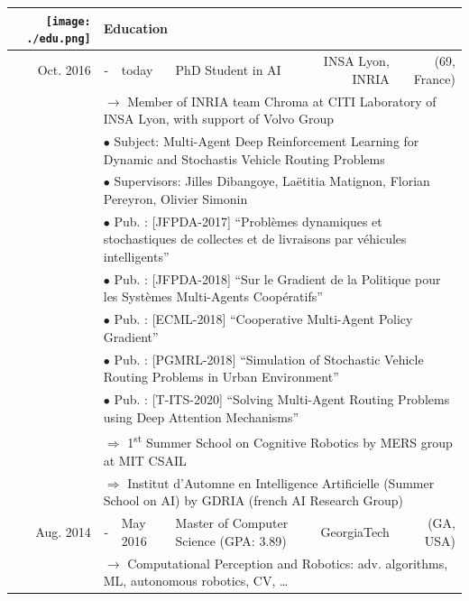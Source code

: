 \documentclass[a4paper]{article}
\begin{document}
\centering
\begin{tabular}{>{\small}r c >{\small}l l r r}
	\texttt{[image: ./edu.png]} &
		\multicolumn{5}{l}{Education} \\
	\hline
	Oct. 2016 &- &today      &PhD Student in AI                      &INSA Lyon, INRIA         &(69, France) \\
		&\multicolumn{5}{l}{$\rightarrow$ {\footnotesize Member of INRIA team Chroma at CITI Laboratory of INSA Lyon, with support of Volvo Group}} \\
		&\multicolumn{5}{l}{$\bullet$ {\footnotesize Subject: Multi-Agent Deep Reinforcement Learning for Dynamic and Stochastis Vehicle Routing Problems}} \\
		&\multicolumn{5}{l}{$\bullet$ {\footnotesize Supervisors: Jilles Dibangoye, La\"etitia Matignon, Florian Pereyron, Olivier Simonin}} \\
		&\multicolumn{5}{l}{$\bullet$ {\footnotesize Pub. : [JFPDA-2017]} {\scriptsize ``Problèmes dynamiques et stochastiques de collectes et de livraisons par véhicules intelligents''}} \\
		&\multicolumn{5}{l}{$\bullet$ {\footnotesize Pub. : [JFPDA-2018]} {\scriptsize ``Sur le Gradient de la Politique pour les Systèmes Multi-Agents Coopératifs''}} \\
		&\multicolumn{5}{l}{$\bullet$ {\footnotesize Pub. : [ECML-2018]} {\scriptsize ``Cooperative Multi-Agent Policy Gradient''}} \\
		&\multicolumn{5}{l}{$\bullet$ {\footnotesize Pub. : [PGMRL-2018]} {\scriptsize ``Simulation of Stochastic Vehicle Routing Problems in Urban Environment'' }} \\
		&\multicolumn{5}{l}{$\bullet$ {\footnotesize Pub. : [T-ITS-2020]} {\scriptsize ``Solving Multi-Agent Routing Problems using Deep Attention Mechanisms''}} \\
		&\multicolumn{5}{l}{$\Rightarrow$ {\footnotesize 1\textsuperscript{st} Summer School on Cognitive Robotics by MERS group at MIT CSAIL}} \\
		&\multicolumn{5}{l}{$\Rightarrow$ {\footnotesize Institut d'Automne en Intelligence Artificielle (Summer School on AI) by GDRIA (french AI Research Group)}} \\
	Aug. 2014 &- &May 2016   &Master of Computer Science (GPA: 3.89) &GeorgiaTech              &(GA, USA) \\
		&\multicolumn{5}{l}{$\rightarrow$ {\footnotesize Computational Perception and Robotics: adv. algorithms, ML, autonomous robotics, CV, …}} \\

\end{tabular}
\end{document}
